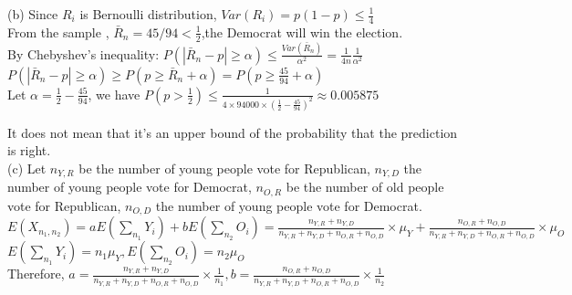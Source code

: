 \documentclass[11pt]{article}
\begin{document}
(b)%
Since $R_i$ is Bernoulli distribution, $Var(R_i)  = p(1 - p) \leq \frac{1}{4}$\\
From the sample , $\bar{R}_n = 45/94 < \frac{1}{2}$,the Democrat will win the election.\\
By Chebyshev's inequality: $P(|\bar{R}_n - p| \geq \alpha) \leq \frac{Var(\bar{R}_n)}{\alpha^2} = \frac{1}{4n} \frac{1}{\alpha^2}$\\
$P(|\bar{R}_n - p| \geq \alpha) \geq P(p \geq \bar{R}_n+ \alpha ) = P(p \geq \frac{45}{94} + \alpha)$\\
Let $\alpha = \frac{1}{2} - \frac{45}{94}$, we have $P(p>\frac{1}{2}) \leq \frac{1}{4\times 94000 \times(\frac{1}{2} - \frac{45}{94})^2 } \approx 0.005875$

It does not mean that it's an upper bound of the probability that the prediction is right. \\

(c) Let $n_{Y,R}$ be the number of young people vote for Republican, $n_{Y,D}$ the number of young people vote for Democrat, $n_{O,R}$ be the number of old people vote for Republican, $n_{O,D}$ the number of young people vote for Democrat.\\
$E(X_{n_1,n_2}) = a E(\sum_{n_1} Y_i) + bE(\sum_{n_2} O_i) = \frac{n_{Y,R}+ n_{Y,D} }{n_{Y,R}+n_{Y,D}+n_{O,R}+n_{O,D}}\times \mu_Y + \frac{n_{O,R}+ n_{O,D}}{n_{Y,R}+n_{Y,D}+n_{O,R}+n_{O,D}}\times \mu_O$\\
$E(\sum_{n_1} Y_i) = n_1 \mu_Y, E(\sum_{n_2} O_i) = n_2\mu_O$\\
Therefore, $a =  \frac{n_{Y,R} + n_{Y,D}}{n_{Y,R}+n_{Y,D}+n_{O,R}+n_{O,D}} \times \frac{1}{n_1}, b = \frac{n_{O,R}+ n_{O,D}}{n_{Y,R}+n_{Y,D}+n_{O,R}+n_{O,D}}\times \frac{1}{n_2} $\\
\end{document}
